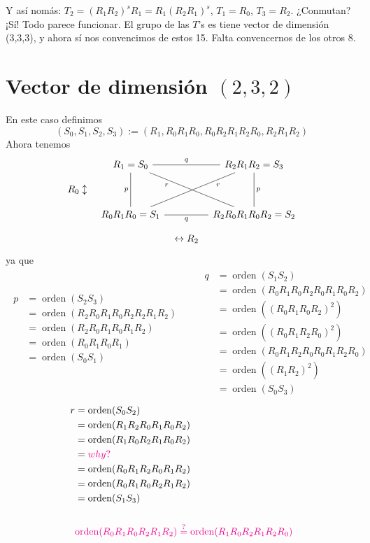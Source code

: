 \documentclass[spanish]{article}
\theoremstyle{definition}
\begin{document}
Y así nomás: $T_2=(R_1R_2)^sR_1=R_1(R_2R_1)^s$, $T_1=R_0$, $T_3=R_2$. ¿Conmutan? ¡Sí! Todo parece funcionar. El grupo de las $T$'s es tiene vector de dimensión (3,3,3), y ahora sí nos convencimos de estos 15. Falta convencernos de los otros 8.


\clearpage
\section{Vector de dimensión $(2,3,2)$}
En este caso definimos
\[(S_0,S_1,S_2,S_3):=(R_1,R_0R_1R_0,R_0R_2R_1R_2R_0,R_2R_1R_2)\]
Ahora tenemos
\[\begin{tikzcd}[column sep=tiny,row sep=small]
	&R_1=S_0\arrow[dd,no head,swap,"p"]\arrow[rr,no head,"q"]\arrow[ddrr,"r",no head,near start,swap]&&R_2R_1R_2=S_3\arrow[dd,no head,"p"]\\
	R_0\updownarrow\\
	&R_0R_1R_0=S_1\arrow[rr,no head,swap,"q"]\arrow[rruu,no head,"r",near end,swap]&&R_2R_0R_1R_0R_2=S_2\\
	&&\leftrightarrow R_2
\end{tikzcd}\]
ya que
\begin{align*}
\begin{aligned}
	p&=\operatorname{orden}(S_2S_3)\\
	&=\operatorname{orden}(R_2R_0R_1R_0R_2R_2R_1R_2)\\
	&=\operatorname{orden}(R_2R_0R_1R_0R_1R_2)\\
	&=\operatorname{orden}(R_0R_1R_0R_1)\\
	&=\operatorname{orden}(S_0S_1)\\\\\
\end{aligned}
\qquad
\begin{aligned}
	q&=\operatorname{orden}(S_1S_2)\\
	&=\operatorname{orden}(R_0R_1R_0R_2R_0R_1R_0R_2)\\
	&=\operatorname{orden}((R_0R_1R_0R_2)^2)\\
	&=\operatorname{orden}((R_0R_1R_2R_0)^2)\\
	&=\operatorname{orden}(R_0R_1R_2R_0R_0R_1R_2R_0)\\
	&=\operatorname{orden}((R_1R_2)^2)\\
	&=\operatorname{orden}(S_0S_3)
\end{aligned}
\end{align*}
\begin{align*}
	r&=\operatorname{orden}(S_0S_2)\\
	&=\operatorname{orden}(R_1R_2R_0R_1R_0R_2)\\
	&=\operatorname{orden}(R_1R_0R_2R_1R_0R_2)\\
	&={\color{magenta}why?}\\
	&=\operatorname{orden}(R_0R_1R_2R_0R_1R_2)\\
	&=\operatorname{orden}(R_0R_1R_0R_2R_1R_2)\\
	&=\operatorname{orden}(S_1S_3)\\\\
	&{\color{magenta}\operatorname{orden}(R_0R_1R_0R_2R_1R_2)\overset{?}{=}\operatorname{orden}(R_1R_0R_2R_1R_2R_0)}
\end{align*}
\end{document}
